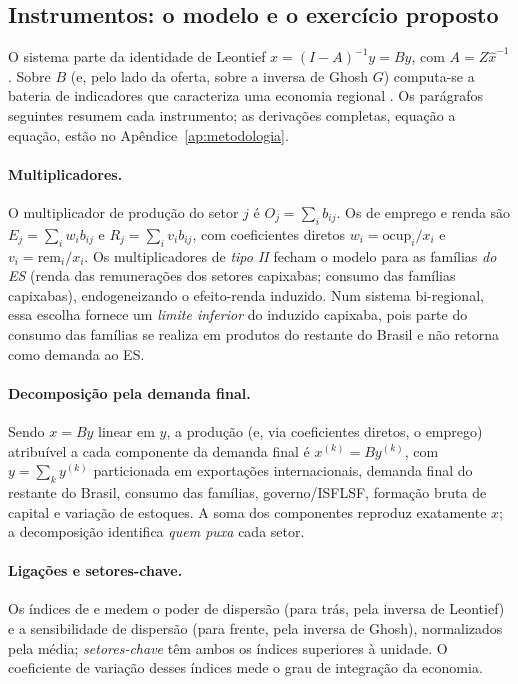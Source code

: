 \documentclass[11pt,a4paper]{article}
\begin{document}
\subsection{Instrumentos: o modelo e o exercício proposto}
\label{sec:instrumentos}
O sistema parte da identidade de Leontief $x=(I-A)^{-1}y=By$, com $A=Z\hat{x}^{-1}$.
Sobre $B$ (e, pelo lado da oferta, sobre a inversa de Ghosh $G$) computa-se a bateria
de indicadores que caracteriza uma economia regional \citep{millerblair2009}. Os parágrafos seguintes resumem cada instrumento; as derivações completas, equação a equação, estão no Apêndice~\ref{ap:metodologia}.

\paragraph{Multiplicadores.}
O multiplicador de produção do setor $j$ é $O_j=\sum_i b_{ij}$. Os de emprego e renda
são $E_j=\sum_i w_i b_{ij}$ e $R_j=\sum_i v_i b_{ij}$, com coeficientes diretos
$w_i=\text{ocup}_i/x_i$ e $v_i=\text{rem}_i/x_i$. Os multiplicadores de \emph{tipo II}
fecham o modelo para as famílias \emph{do ES} (renda das remunerações dos setores capixabas;
consumo das famílias capixabas), endogeneizando o efeito-renda induzido. Num sistema bi-regional,
essa escolha fornece um \emph{limite inferior} do induzido capixaba, pois parte do consumo das
famílias se realiza em produtos do restante do Brasil e não retorna como demanda ao ES.

\paragraph{Decomposição pela demanda final.}
Sendo $x=By$ linear em $y$, a produção (e, via coeficientes diretos, o emprego)
atribuível a cada componente da demanda final é $x^{(k)}=By^{(k)}$, com
$y=\sum_k y^{(k)}$ particionada em exportações internacionais, demanda final do
restante do Brasil, consumo das famílias, governo/ISFLSF, formação bruta de capital e
variação de estoques. A soma dos componentes reproduz exatamente $x$; a decomposição
identifica \emph{quem puxa} cada setor.

\paragraph{Ligações e setores-chave.}
Os índices de \citet{rasmussen1956} e \citet{hirschman1958} medem o poder de dispersão
(para trás, pela inversa de Leontief) e a sensibilidade de dispersão (para frente, pela
inversa de Ghosh), normalizados pela média; \emph{setores-chave} têm ambos os índices
superiores à unidade. O coeficiente de variação desses índices mede o grau de
integração da economia.
\end{document}
